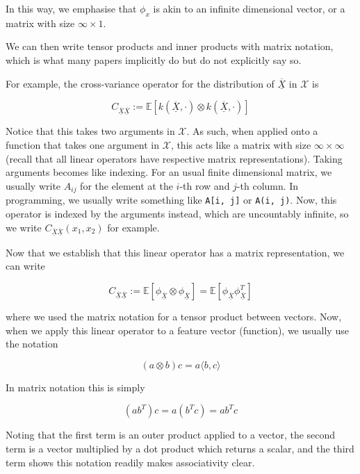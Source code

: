 \documentclass[twoside]{article} \usepackage{aistats2017}
\newcommand{\rv}[1]{\underline{\overline{#1}}}
\begin{document}
	In this way, we emphasise that $\phi_{x}$ is akin to an infinite dimensional vector, or a matrix with size $\infty \times 1$.
	
	We can then write tensor products and inner products with matrix notation, which is what many papers implicitly do but do not explicitly say so.
	
	For example, the cross-variance operator for the distribution of $\rv{X}$ in $\mathcal{X}$ is
	
		\begin{equation}
			C_{\rv{X} \rv{X}} := \mathbb{E}[k(\rv{X}, \cdot) \otimes k(\rv{X}, \cdot)]
		\end{equation}
		
	Notice that this takes two arguments in $\mathcal{X}$. As such, when applied onto a function that takes one argument in $\mathcal{X}$, this acts like a matrix with size $\infty \times \infty$ (recall that all linear operators have respective matrix representations). Taking arguments becomes like indexing. For an usual finite dimensional matrix, we usually write $A_{i j}$ for the element at the $i$-th row and $j$-th column. In programming, we usually write something like \texttt{A[i, j]} or \texttt{A(i, j)}. Now, this operator is indexed by the arguments instead, which are uncountably infinite, so we write $C_{\rv{X} \rv{X}}(x_{1}, x_{2})$ for example.
	
	Now that we establish that this linear operator has a matrix representation, we can write 

		\begin{equation}
			C_{\rv{X} \rv{X}} := \mathbb{E}[\phi_{\rv{X}} \otimes \phi_{\rv{X}}] = \mathbb{E}[\phi_{\rv{X}} \phi_{\rv{X}}^{T}]
		\end{equation}
	
	where we used the matrix notation for a tensor product between vectors. Now, when we apply this linear operator to a feature vector (function), we usually use the notation
	
		\begin{equation}
			(a \otimes b) c = a \langle b, c \rangle
		\end{equation}
		
	In matrix notation this is simply
	
		\begin{equation}
			(a b^{T}) c = a (b^{T} c) = a b^{T} c
		\end{equation}
		
	Noting that the first term is an outer product applied to a vector, the second term is a vector multiplied by a dot product which returns a scalar, and the third term shows this notation readily makes associativity clear.
	
\end{document}
